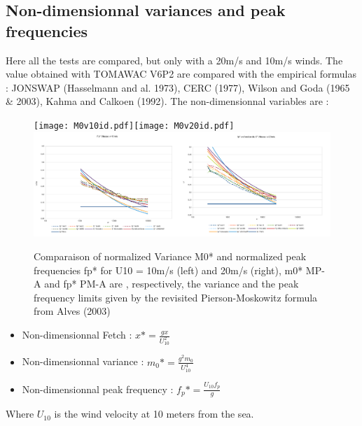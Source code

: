 \documentclass[10pt]{article}
\begin{document}
\subsection{Non-dimensionnal variances and peak frequencies}
Here all the tests are compared, but only with a 20m/s and 10m/s winds. The value obtained with TOMAWAC V6P2 are compared with the empirical formulas : JONSWAP (Hasselmann and al. 1973), CERC (1977), Wilson and Goda (1965 \& 2003), Kahma and Calkoen (1992). The non-dimensionnal variables are :\\
\begin{figure}[H]
  \centering
  	\texttt{[image: M0v10id.pdf]}\texttt{[image: M0v20id.pdf]}\\
  	\includegraphics[width=0.5\textwidth]{fpv10id.pdf}\includegraphics[width=0.5\textwidth]{fpv20id.pdf}\\
      \caption{Comparaison of normalized Variance M0* and normalized peak frequencies fp* for U10 = 10m/s (left) and 20m/s (right), m0* MP-A and fp* PM-A are , respectively, the variance and the peak frequency limits given by the revisited Pierson-Moskowitz formula from Alves (2003)}
\end{figure}
\begin{itemize}
\item Non-dimensionnal Fetch : $x* = \frac{g x}{U_{10}^2}$
\item Non-dimensionnal variance : $m_{0}* = \frac{g^2 m_{0}}{U_{10}^4}$
\item Non-dimensionnal peak frequency : $f_{p}* = \frac{U_{10} f_{p}}{g}$
\end{itemize}
Where $U_{10}$ is the wind velocity at 10 meters from the sea.\\
\end{document}
